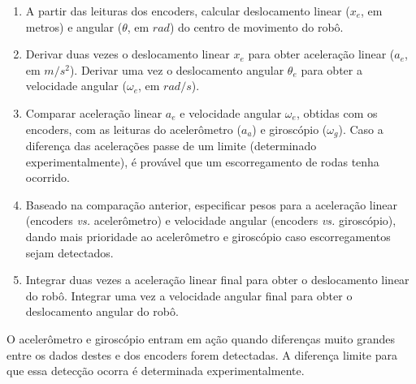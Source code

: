 \begin{enumerate}
      \item A partir das leituras dos encoders, calcular deslocamento linear ($x_e$, em metros) e angular ($\theta$, em $rad$) do centro de movimento do robô.
      \item Derivar duas vezes o deslocamento linear $x_e$ para obter aceleração linear ($a_e$, em $m/s^2$). Derivar uma vez o deslocamento angular $\theta_e$ para obter a velocidade angular ($\omega_e$, em $rad/s$).
      \item Comparar aceleração linear $a_e$ e velocidade angular $\omega_e$, obtidas com os encoders, com as leituras do acelerômetro ($a_a$) e giroscópio ($\omega_g$). Caso a diferença das acelerações passe de um limite (determinado experimentalmente), é provável que um escorregamento de rodas tenha ocorrido.
      \item Baseado na comparação anterior, especificar pesos para a aceleração linear (encoders \textit{vs.} acelerômetro) e velocidade angular (encoders \textit{vs.} giroscópio), dando mais prioridade ao acelerômetro e giroscópio caso escorregamentos sejam detectados.
      \item Integrar duas vezes a aceleração linear final para obter o deslocamento linear do robô. Integrar uma vez a velocidade angular final para obter o deslocamento angular do robô.
\end{enumerate}


O acelerômetro e giroscópio entram em ação quando diferenças muito grandes entre os dados destes e dos encoders forem detectadas. A diferença limite para que essa detecção ocorra é determinada experimentalmente.

